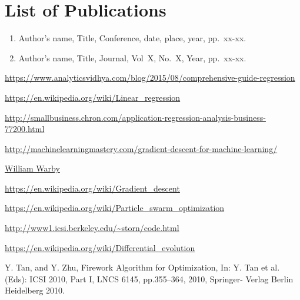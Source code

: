 \documentclass[11pt, a4paper]{report}
\begin{document}
\chapter*{List of Publications}
\begin{enumerate}
\item Author's name, Title, Conference, date, place, year, pp.~xx-xx.
\item Author's name, Title, Journal, Vol~X, No.~X, Year, pp.~xx-xx.
\end{enumerate}
\newpage
\begin{thebibliography}{50}
	
\url{https://www.analyticsvidhya.com/blog/2015/08/comprehensive-guide-regression}

\url{https://en.wikipedia.org/wiki/Linear_regression}

\url{http://smallbusiness.chron.com/application-regression-analysis-business-77200.html}

\url{http://machinelearningmastery.com/gradient-descent-for-machine-learning/}

\href{https://www.flickr.com/photos/wwarby/4046737583/}{William Warby}

\url{https://en.wikipedia.org/wiki/Gradient_descent}

\url{https://en.wikipedia.org/wiki/Particle_swarm_optimization}

\url{http://www1.icsi.berkeley.edu/~storn/code.html}

\url{https://en.wikipedia.org/wiki/Differential_evolution}

Y. Tan, and Y. Zhu, Firework Algorithm for Optimization, In: Y. Tan et
al.(Eds): ICSI 2010, Part I, LNCS 6145, pp.355–364, 2010, Springer-
Verlag Berlin Heidelberg 2010.

\end{thebibliography}
\end{document}
